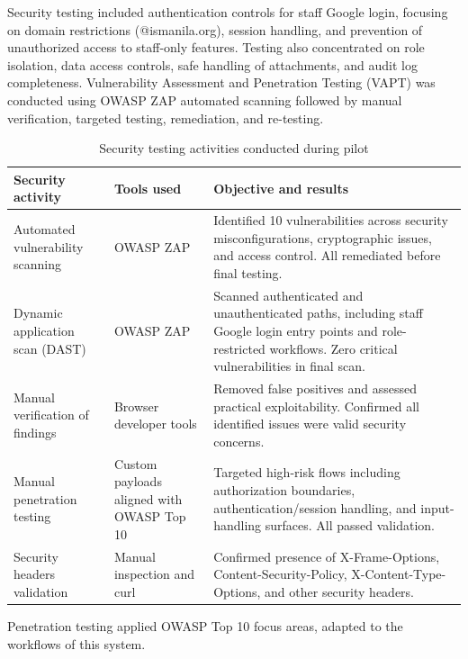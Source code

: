 Security testing included authentication controls for staff Google login, focusing on domain restrictions (@ismanila.org), session handling, and prevention of unauthorized access to staff-only features. Testing also concentrated on role isolation, data access controls, safe handling of attachments, and audit log completeness. Vulnerability Assessment and Penetration Testing (VAPT) was conducted using OWASP ZAP automated scanning followed by manual verification, targeted testing, remediation, and re-testing.

\begin{table}[h!]
\centering
\caption{Security testing activities conducted during pilot}
\label{tab:security_activities}
\renewcommand{\arraystretch}{1.15}
\setlength{\tabcolsep}{5pt}
\begin{tabularx}{\textwidth}{@{}
  >{\RaggedRight\arraybackslash}p{4.2cm}
  >{\RaggedRight\arraybackslash}p{4.2cm}
  >{\RaggedRight\arraybackslash}X
@{}}
\toprule
\textbf{Security activity} & \textbf{Tools used} & \textbf{Objective and results} \\
\midrule
Automated vulnerability scanning &
OWASP ZAP &
Identified 10 vulnerabilities across security misconfigurations, cryptographic issues, and access control. All remediated before final testing. \\
Dynamic application scan (DAST) &
OWASP ZAP &
Scanned authenticated and unauthenticated paths, including staff Google login entry points and role-restricted workflows. Zero critical vulnerabilities in final scan. \\
Manual verification of findings &
Browser developer tools &
Removed false positives and assessed practical exploitability. Confirmed all identified issues were valid security concerns. \\
Manual penetration testing &
Custom payloads aligned with OWASP Top 10 &
Targeted high-risk flows including authorization boundaries, authentication/session handling, and input-handling surfaces. All passed validation. \\
Security headers validation &
Manual inspection and curl &
Confirmed presence of X-Frame-Options, Content-Security-Policy, X-Content-Type-Options, and other security headers. \\
\bottomrule
\end{tabularx}
\end{table}

Penetration testing applied OWASP Top 10 focus areas, adapted to the workflows of this system.

